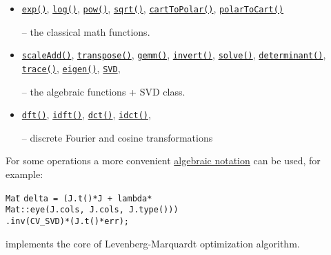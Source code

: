 \documentclass[10pt,landscape]{article}
\begin{document}
\begin{multicols}{3}
\begin{itemize}
\item
\texttt{\href{http://docs.opencv.org/modules/core/doc/operations_on_arrays.html\#exp}{exp()}},
\texttt{\href{http://docs.opencv.org/modules/core/doc/operations_on_arrays.html\#log}{log()}},
\texttt{\href{http://docs.opencv.org/modules/core/doc/operations_on_arrays.html\#pow}{pow()}},
\texttt{\href{http://docs.opencv.org/modules/core/doc/operations_on_arrays.html\#sqrt}{sqrt()}},
\texttt{\href{http://docs.opencv.org/modules/core/doc/operations_on_arrays.html\#carttopolar}{cartToPolar()}},
\texttt{\href{http://docs.opencv.org/modules/core/doc/operations_on_arrays.html\#polartocart}{polarToCart()}}

-- the classical math functions.

\item
\texttt{\href{http://docs.opencv.org/modules/core/doc/operations_on_arrays.html\#scaleadd}{scaleAdd()}},
\texttt{\href{http://docs.opencv.org/modules/core/doc/operations_on_arrays.html\#transpose}{transpose()}},
\texttt{\href{http://docs.opencv.org/modules/core/doc/operations_on_arrays.html\#gemm}{gemm()}},
\texttt{\href{http://docs.opencv.org/modules/core/doc/operations_on_arrays.html\#invert}{invert()}},
\texttt{\href{http://docs.opencv.org/modules/core/doc/operations_on_arrays.html\#solve}{solve()}},
\texttt{\href{http://docs.opencv.org/modules/core/doc/operations_on_arrays.html\#determinant}{determinant()}},
\texttt{\href{http://docs.opencv.org/modules/core/doc/operations_on_arrays.html\#trace}{trace()}},
\texttt{\href{http://docs.opencv.org/modules/core/doc/operations_on_arrays.html\#eigen}{eigen()}},
\texttt{\href{http://docs.opencv.org/modules/core/doc/operations_on_arrays.html\#SVD}{SVD}},

-- the algebraic functions + SVD class.

\item
\texttt{\href{http://docs.opencv.org/modules/core/doc/operations_on_arrays.html\#dft}{dft()}},
\texttt{\href{http://docs.opencv.org/modules/core/doc/operations_on_arrays.html\#idft}{idft()}},
\texttt{\href{http://docs.opencv.org/modules/core/doc/operations_on_arrays.html\#dct}{dct()}},
\texttt{\href{http://docs.opencv.org/modules/core/doc/operations_on_arrays.html\#idct}{idct()}},

-- discrete Fourier and cosine transformations

\end{itemize}

For some operations a more convenient \href{http://docs.opencv.org/modules/core/doc/basic_structures.html\#matrix-expressions}{algebraic notation} can be used, for example:
\begin{tabbing}
\texttt{Mat}\={} \texttt{delta = (J.t()*J + lambda*}\\
\>\texttt{Mat::eye(J.cols, J.cols, J.type()))}\\
\>\texttt{.inv(CV\_SVD)*(J.t()*err);}
\end{tabbing}
implements the core of Levenberg-Marquardt optimization algorithm.


\end{multicols}
\end{document}
